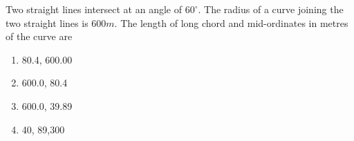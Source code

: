 \documentclass[journal]{IEEEtran}
\begin{document}
\begin{enumerate}
{        Two straight lines intersect at an angle of $60^\circ$. The radius of a curve joining the two straight lines is $600m$. The length of long chord and mid-ordinates in metres of the curve are
        \hfill
        
        \begin{multicols}{4}
        	\begin{enumerate}
        		\item 80.4, 600.00
        		\item 600.0, 80.4
        		\item 600.0, 39.89
        		\item 40, 89,300
        	\end{enumerate}
        \end{multicols}
        
        }
    \end{enumerate}
\end{document}
